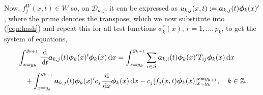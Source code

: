 Now, \(f_j^W(x,t)\in W\) so, on \(\mathcal D_{k,j}\), it can be expressed as \(u_{k,j}(x,t):=\boldsymbol a_{k,j}(t) \boldsymbol \phi_k(x)'{}\), where the prime denotes the transpose, which we now substitute into (\ref{eqn:hash})
and repeat this for all test functions \(\phi^r_k(x)\), \(r=1,...,p_k\), to get the system of equations,
\begin{align}
	\begin{multlined}[t]\int_{x=y_k}^{y_{k+1}}\cfrac{\wrt}{\wrt t} \boldsymbol a_{k,j}(t) \boldsymbol \phi_k(x)\tr{}\boldsymbol \phi_k(x)\wrt x = \int_{x=y_k}^{y_{k+1}}\sum_{i\in\calS} \boldsymbol a_{k,i}(t) \boldsymbol \phi_k(x)\tr{}T_{ij}\boldsymbol\phi_k (x)\wrt x  
	\\{}+  \int_{x=y_k}^{y_{k+1}}\boldsymbol a_{k,j}(t) \boldsymbol \phi_k(x)\tr{}c_j\cfrac{\wrt}{\wrt x}\boldsymbol\phi_k(x)\wrt x - c_j[f_j(x,t) \boldsymbol\phi_k(x)]_{x=y_k}^{x=y_{k+1}},\quad k\in\mathbb Z. \end{multlined} \label{eqn:DG system}
\end{align}

